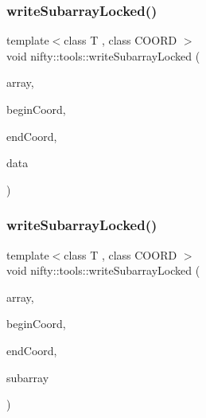 \mbox{\label{namespacenifty_1_1tools_a0d4355b32819ca638b88af283797bc92}} 
\subsubsection{\texorpdfstring{write\+Subarray\+Locked()}{writeSubarrayLocked()}\hspace{0.1cm}{\footnotesize\ttfamily [1/2]}}
{\footnotesize\ttfamily template$<$class T , class C\+O\+O\+RD $>$ \\
void nifty\+::tools\+::write\+Subarray\+Locked (\begin{DoxyParamCaption}\item[{\hyperlink{classandres_1_1View}{marray\+::\+View}$<$ T $>$}]{array,  }\item[{const C\+O\+O\+RD \&}]{begin\+Coord,  }\item[{const C\+O\+O\+RD \&}]{end\+Coord,  }\item[{const \hyperlink{classandres_1_1View}{marray\+::\+View}$<$ T $>$ \&}]{data }\end{DoxyParamCaption})\hspace{0.3cm}{\ttfamily [inline]}}

\mbox{\label{namespacenifty_1_1tools_a102fca55b5880c5b398205f0b438fbfe}} 
\subsubsection{\texorpdfstring{write\+Subarray\+Locked()}{writeSubarrayLocked()}\hspace{0.1cm}{\footnotesize\ttfamily [2/2]}}
{\footnotesize\ttfamily template$<$class T , class C\+O\+O\+RD $>$ \\
void nifty\+::tools\+::write\+Subarray\+Locked (\begin{DoxyParamCaption}\item[{hdf5\+::\+Hdf5\+Array$<$ T $>$ \&}]{array,  }\item[{const C\+O\+O\+RD \&}]{begin\+Coord,  }\item[{const C\+O\+O\+RD \&}]{end\+Coord,  }\item[{const \hyperlink{classandres_1_1View}{marray\+::\+View}$<$ T $>$ \&}]{subarray }\end{DoxyParamCaption})\hspace{0.3cm}{\ttfamily [inline]}}

